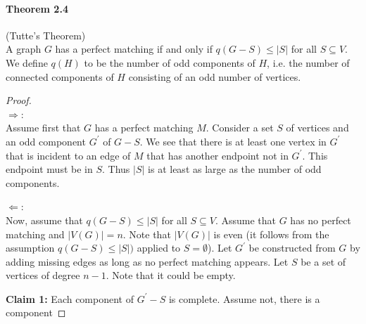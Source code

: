\paragraph{Theorem 2.4} (Tutte's Theorem) \\
A graph $ G $ has a perfect matching if and only if $ q(G - S) \leq |S| $ for all 
$ S \subseteq V $. We define $ q(H) $ to be the number of odd components of $ H $,
i.e. the number of connected components of $ H $ consisting of an odd number of 
vertices. 
\begin{proof} $ $ \\
   $\Rightarrow$: \\
   Assume first that $ G $ has a perfect matching $ M $. Consider a set $ S $ of vertices
   and an odd component $ G^\prime $ of $ G - S $. We see that there is at least one 
   vertex in $ G^\prime $ that is incident to an edge of $ M $ that has another endpoint 
   not in $ G^\prime $. This endpoint must be in $ S$. Thus $ |S| $ is at least as large as 
   the number of odd components. 
   
   $\Leftarrow$: \\ 
   Now, assume that $ q(G - S) \leq |S| $ for all $ S \subseteq V$. Assume that $ G $ 
   has no perfect matching and $ |V(G)| = n $. Note that $|V(G)|$ is even (it follows from 
   the assumption $ q(G - S) \leq |S|) $ applied to $ S = \emptyset$). Let $ G^\prime$
   be constructed from $ G $ by adding missing edges as long as no perfect matching appears.
   Let $ S $ be a set of vertices of degree $ n - 1$. Note that it could be empty.

   \bigskip \noindent
   \textbf{Claim 1:} Each component of $ G^\prime - S $ is complete. Assume not, 
   there is a component 
\end{proof}